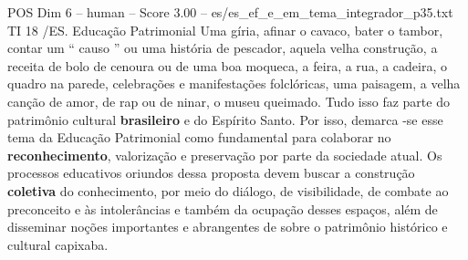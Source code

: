\begin{textsample}{POS Dim 6 – human – Score 3.00 – es/es\_ef\_e\_em\_tema\_integrador\_p35.txt}  \label{ex:f6_pos_015}
TI 18 /ES.
Educação Patrimonial Uma gíria, afinar o cavaco, bater o tambor, contar um “ causo ” ou uma história de pescador, aquela velha construção, a receita de bolo de cenoura ou de uma boa moqueca, a feira, a rua, a cadeira, o quadro na parede, celebrações e manifestações folclóricas, uma paisagem, a velha canção de amor, de rap ou de ninar, o museu queimado.
Tudo isso faz parte do patrimônio cultural \textbf{brasileiro} e do Espírito Santo.
Por isso, demarca -se esse tema da Educação Patrimonial como fundamental para colaborar no \textbf{reconhecimento}, valorização e preservação por parte da sociedade atual.
Os processos educativos oriundos dessa proposta devem buscar a construção \textbf{coletiva} do conhecimento, por meio do diálogo, de visibilidade, de combate ao preconceito e às intolerâncias e também da ocupação desses espaços, além de disseminar noções importantes e abrangentes de sobre o patrimônio histórico e cultural capixaba.

\end{textsample}
